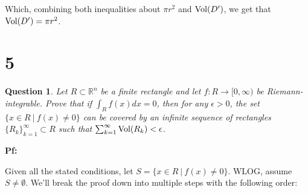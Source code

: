 \documentclass{article}
\newtheorem{question}{Question}
\begin{document}
Which, combining both inequalities about $\pi r^2$ and $\textmd{Vol}(D')$, we get that $\textmd{Vol}(D')=\pi r^2$.

\break

\section*{5}
\begin{myBox}[]{}
    \begin{question}
        Let $R\subset\mathbb{R}^n$ be a finite rectangle and let $f:R\rightarrow[0,\infty)$ be Riemann-integrable. Prove that if $\int_Rf(x)dx = 0$, then for any $\epsilon>0$, the set $\{x\in R\ |\ f(x)\neq 0\}$ can be covered by an infinite sequence of rectangles $\{R_k\}_{k=1}^{\infty}\subset R$ such that $\sum_{k=1}^{\infty}\textmd{Vol}(R_k)<\epsilon$.
    \end{question}
\end{myBox}

\textbf{Pf:}

Given all the stated conditions, let $S=\{x\in R\ |\ f(x)\neq 0\}$. WLOG, assume $S\neq \emptyset$. We'll break the proof down into multiple steps with the following order:
\begin{comment}
\subsection*{1. $f$ is bounded:}
We'll approach by contradiction. Suppose $f$ is not bounded instead, then for all $n\in\mathbb{N}$, there exists $x_n\in R$, such that $f(x_n)>n$. Then, since the sequence $(x_n)_{n\in\mathbb{N}}\subset R$, while $R$ as a finite rectangle is compact, there exists a subsequence $(x_{n_k})_{k\in\mathbb{N}}$ that converges to some point $x^*\in R$.

Now, take any partition $P$ of $R$, there exists some subcollection of rectangles $R_1,...,R_j\in P$, such that each mentioned $R_i$ contains $x^*$ (and can assume this list contains all such rectangle). Which, since $x^*$ is the limit of $(x_{n_k})_{k\in\mathbb{N}}\subset R$, then for any radius $r>0$, the open ball $B_r(x^*)$ contains infinitely many points from $(x_{n_k})_{k\in\mathbb{N}}$.

Also, since each $R_i$ as a rectangle has no isolated points, then $x^*\in R_i$, $R_i\cap(B_r(x^*)\setminus x^*)\neq \emptyset$. So, assume $r$ is small enough such that $B_r(x^*)\subseteq \bigcup_{i=1}^{j}R_i$, then at least one of the $R_i$ must contain infinitely many points from $(x_{n_k})_{k\in\mathbb{N}}$. Hence, for this $R_i$, since for every $K\in\mathbb{N}$, there always exists integer $k\geq K$, such that $x_k\in R_i$, then because $f(x_{n_k}) > n_k \geq k \geq K$, this indicates that $f$ is not bounded within $R_i$, hence $\sup_{x\in R_i}(f(x))=\infty$, showing that the upper sum based on $P$ is not defined. 

Yet, this contradicts the fact that $f$ is Riemann-Integrable (since we need the upper sum to be defined for each partition before talkinag about integrability), so our assumption is false, $f$ must be bounded. Hence, $M=\sup_{x\in R}(f(x))$ exists.
\end{comment}
\end{document}
